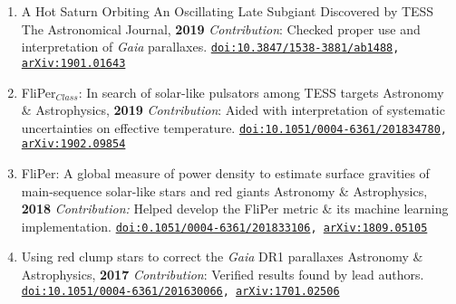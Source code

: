 \documentclass[letterpaper]{k-cv} %
\begin{document}
\begin{enumerate}
	\item {}
	{{A Hot Saturn Orbiting An Oscillating Late Subgiant Discovered by TESS}}
	{The Astronomical Journal, \textbf{2019}}
	{\textit{Contribution}: Checked proper use and interpretation of \textit{Gaia} parallaxes.}	
	{\texttt{\href{https://iopscience.iop.org/article/10.3847/1538-3881/ab1488}{doi:10.3847/1538-3881/ab1488}, \href{https://arxiv.org/abs/1901.01643}{arXiv:1901.01643}}}

	\item {}
	{FliPer$_{Class}$: In search of solar-like pulsators among TESS targets}
	{Astronomy \& Astrophysics, \textbf{2019}}
	{\textit{Contribution}: Aided with interpretation of systematic uncertainties on effective temperature.}	
	{\texttt{\href{https://www.aanda.org/articles/aa/abs/2019/04/aa34780-18/aa34780-18.html}{doi:10.1051/0004-6361/201834780}, \href{https://arxiv.org/abs/1902.09854}{arXiv:1902.09854}}}
	
	\item {}
	{FliPer: A global measure of power density to estimate surface gravities of main-sequence solar-like stars and red giants}
	{Astronomy \& Astrophysics, \textbf{2018}}
	{\textit{Contribution:} Helped develop the FliPer metric \& its machine learning implementation.}
	{\texttt{\href{https://www.aanda.org/articles/aa/abs/2018/12/aa33106-18/aa33106-18.html}{doi:0.1051/0004-6361/201833106}, \href{https://arxiv.org/abs/1809.05105}{arXiv:1809.05105}}}	
		
	\item {}
	{Using red clump stars to correct the \emph{Gaia} DR1 parallaxes}
	{Astronomy \& Astrophysics, \textbf{2017}}
	{\textit{Contribution}: Verified results found by lead authors.}	
	{\texttt{\href{https://www.aanda.org/articles/aa/abs/2017/02/aa30066-16/aa30066-16.html}{doi:10.1051/0004-6361/201630066}, \href{https://arxiv.org/abs/1701.02506}{arXiv:1701.02506}}}
\end{enumerate}
\end{document}

